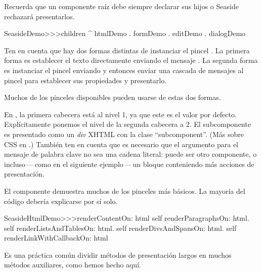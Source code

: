 \documentclass[a4paper,10pt,twoside]{book}
\begin{document}
\noindent
Recuerda que un componente raíz debe siempre declarar sus hijos o Seaside rechazará presentarlos.
\begin{code}{}
SeasideDemo>>>children
	^ { htmlDemo . formDemo . editDemo . dialogDemo }
\end{code}

Ten en cuenta que hay dos formas distintas de instanciar el pincel . La primera forma es establecer el texto directamente enviando el mensaje .
La segunda forma es instanciar el pincel enviando  y entonces enviar una cascada de mensajes al pincel para establecer sus propiedades y presentarlo.

Muchos de los pinceles disponibles pueden usarse de estas dos formas.


En , la primera cabecera está al nivel 1, ya que este es el valor por defecto.
Explícitamente ponemos el nivel de la segunda cabecera a 2.
El subcomponente es presentado como un \emph{div} XHTML con la clase  ``subcomponent''.
(Más sobre CSS en .)
También ten en cuenta que es necesario que el argumento para el mensaje de palabra clave  no sea una cadena literal: puede ser otro componente, o incluso\,---\,como en el siguiente ejemplo\,---\,un bloque conteniendo más acciones de presentación.

El componente  demuestra muchos de los pinceles más básicos.
La mayoría del código debería explicarse por sí solo.

\begin{code}{}
SeasideHtmlDemo>>>renderContentOn: html 
	self renderParagraphsOn: html.
	self renderListsAndTablesOn: html.
	self renderDivsAndSpansOn: html.
	self renderLinkWithCallbackOn: html
\end{code}

Es una práctica común dividir métodos de presentación largos en muchos métodos auxiliares, como hemos hecho aquí.

\end{document}
